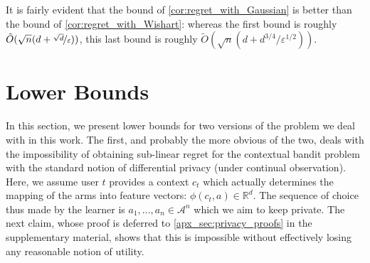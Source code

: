 \documentclass{article}
\newcommand{\Real}{\mathds{R}}
\renewcommand{\Pr}{\mathds{P}}
\newcommand{\A}{\mathcal{A}}
\begin{document}
\vspace{-\parskip}
It is fairly evident that the bound of \cref{cor:regret_with_Gaussian} is better than the bound of \cref{cor:regret_with_Wishart}: whereas the first bound is roughly $\tilde O(\sqrt n(d+\nicefrac {\sqrt d}\varepsilon
))$, this last bound is roughly $\tilde O(\sqrt n(d + d^{3/4}/\varepsilon^{1/2}))$.
\section{Lower Bounds}
\label{sec:lower-bounds}

In this section, we present lower bounds for two versions of the
problem we deal with in this work. The first, and probably the more
obvious of the two, deals with the impossibility of obtaining
sub-linear regret for the contextual bandit problem with the standard
notion of differential privacy (under continual observation). Here, we
assume user $t$ provides a context $c_t$ which actually determines the
mapping of the arms into feature vectors: $\phi(c_t, a) \in
\Real^d$. The sequence of choice thus made by the learner is
$a_1,..., a_n \in \A^n$ which we aim to keep private. The next
claim, whose proof is deferred to \cref{apx_sec:privacy_proofs}
in the supplementary material, shows that this is impossible without
effectively losing any reasonable notion of utility.
\DeclareRobustCommand{\DPDefinition} {Formally, two sequences
  $S = \langle (c_1, y_1),..., (c_n,y_n)\rangle$ and
  $S' = \langle (c'_1, y'_1),..., (c'_n,y'_n)\rangle$ are called
  neighbors if there exists a single $t$ such that for any $t'\neq t$
  we have $(c_{t'},y_{t'}) = (c'_{t'},y'_{t'})$); and an algorithm $A$
  is $(\varepsilon,\delta)$-differentially private if for any two
  neigboring sequences $S$ and $S'$ and any subsets of sequences of
  actions ${\cal S}\subset \A^n$ it holds that
  $\Pr[A(S)\in\mathcal{S}] \leq e^\varepsilon \Pr[A(S')\in
  \mathcal{S}] +\delta$.}
\end{document}

